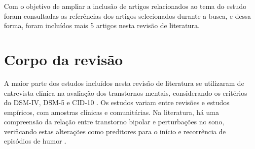\documentclass[chapter=TITLE,
               oneside,
               12pt,
               a4paper,
               english,
               brazil]{abntex2}    %
\begin{document}
        \begin{table}[H]
        \end{table}

        Com o objetivo de ampliar a inclusão de artigos relacionados ao tema do estudo
        foram consultadas as referências dos artigos selecionados durante a busca, e
        dessa forma, foram incluídos mais 5 artigos nesta revisão de literatura.

    \section{Corpo da revisão}\label{sec:corporevisao}

        A maior parte dos estudos incluídos nesta revisão de literatura se utilizaram
        de entrevista clínica na avaliação dos transtornos mentais, considerando os
        critérios do DSM-IV, DSM-5 e CID-10
        \parencite{american_psychiatric_association_diagnostic_1998,
        american_psychiatric_association_diagnostic_2013,
        organizacao_mundial_da_saude_cid-10_2000}.
        Os estudos variam entre revisões e estudos empíricos,
        com amostras clínicas e comunitárias.
        Na literatura, há uma compreensão da relação entre transtorno bipolar
        e perturbações no sono, verificando estas alterações como preditores
        para o início e recorrência de episódios de humor
        \parencite{pancheri_systematic_2019,
        melo_sleep_2016,harvey_sleep_2009,
        ritter_role_2011,andrade-gonzalez_initial_2020,
        kaplan_sleep_2020}.
\end{document}
